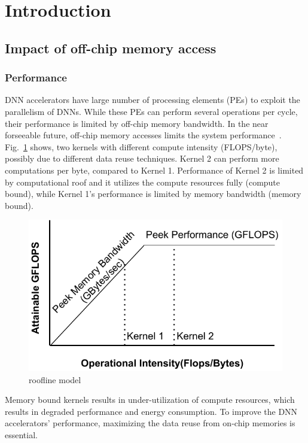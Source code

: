 \documentclass[a4paper,10pt]{article}
\begin{document}

\section{Introduction}

\subsection{Impact of off-chip memory access}
\subsubsection{Performance}
DNN accelerators have large number of processing elements (PEs) to exploit the parallelism of DNNs. While these PEs can perform several operations per cycle, their performance is limited by off-chip memory bandwidth. In the near forseeable future, off-chip memory accesses limits the system performance~\cite{williams2009roofline}. Fig.~\ref{fig:roofline} shows, two kernels with different compute intensity (FLOPS/byte), possibly due to different data reuse techniques. Kernel 2 can perform more computations per byte, compared to Kernel 1. Performance of Kernel 2 is limited by computational roof and it utilizes the compute resources fully (compute bound), while Kernel 1's performance is limited by memory bandwidth (memory bound).
\begin{figure}[!htb]
	\centering
	\includegraphics[width=0.5\linewidth]{./images/roofline}
	\caption{roofline model}
	\label{fig:roofline}
\end{figure}
Memory bound kernels results in under-utilization of compute resources, which results in degraded performance and energy consumption. To improve the DNN accelerators' performance, maximizing the data reuse from on-chip memories is essential.
\end{document}
